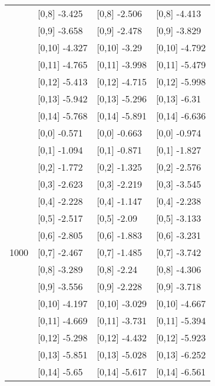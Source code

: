 \begin{table}
\begin{tabular}[t]{llll}
 & {}[0,8] -3.425 & {}[0,8] -2.506 & {}[0,8] -4.413\\
 & {}[0,9] -3.658 & {}[0,9] -2.478 & {}[0,9] -3.829\\
\addlinespace
 & {}[0,10] -4.327 & {}[0,10] -3.29 & {}[0,10] -4.792\\
 & {}[0,11] -4.765 & {}[0,11] -3.998 & {}[0,11] -5.479\\
 & {}[0,12] -5.413 & {}[0,12] -4.715 & {}[0,12] -5.998\\
 & {}[0,13] -5.942 & {}[0,13] -5.296 & {}[0,13] -6.31\\
 & {}[0,14] -5.768 & {}[0,14] -5.891 & {}[0,14] -6.636\\
\addlinespace
 & {}[0,0] -0.571 & {}[0,0] -0.663 & {}[0,0] -0.974\\
 & {}[0,1] -1.094 & {}[0,1] -0.871 & {}[0,1] -1.827\\
 & {}[0,2] -1.772 & {}[0,2] -1.325 & {}[0,2] -2.576\\
 & {}[0,3] -2.623 & {}[0,3] -2.219 & {}[0,3] -3.545\\
 & {}[0,4] -2.228 & {}[0,4] -1.147 & {}[0,4] -2.238\\
\addlinespace
 & {}[0,5] -2.517 & {}[0,5] -2.09 & {}[0,5] -3.133\\
 & {}[0,6] -2.805 & {}[0,6] -1.883 & {}[0,6] -3.231\\
1000 & {}[0,7] -2.467 & {}[0,7] -1.485 & {}[0,7] -3.742\\
 & {}[0,8] -3.289 & {}[0,8] -2.24 & {}[0,8] -4.306\\
 & {}[0,9] -3.556 & {}[0,9] -2.228 & {}[0,9] -3.718\\
\addlinespace
 & {}[0,10] -4.197 & {}[0,10] -3.029 & {}[0,10] -4.667\\
 & {}[0,11] -4.669 & {}[0,11] -3.731 & {}[0,11] -5.394\\
 & {}[0,12] -5.298 & {}[0,12] -4.432 & {}[0,12] -5.923\\
 & {}[0,13] -5.851 & {}[0,13] -5.028 & {}[0,13] -6.252\\
 & {}[0,14] -5.65 & {}[0,14] -5.617 & {}[0,14] -6.561\\
\bottomrule
\end{tabular}
\end{table}
